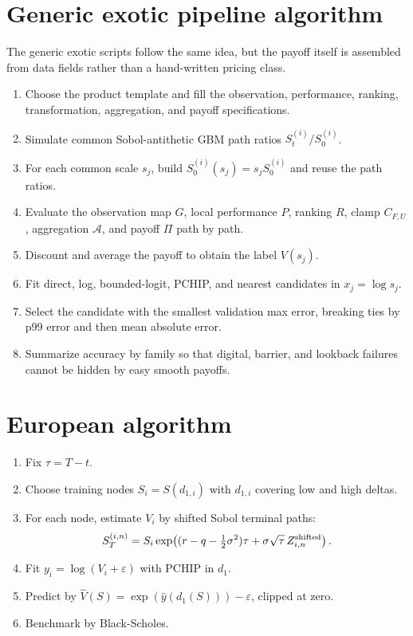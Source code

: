 \documentclass[11pt,oneside]{book}
\theoremstyle{definition}
\begin{document}
\section{Generic exotic pipeline algorithm}
The generic exotic scripts follow the same idea, but the payoff itself is
assembled from data fields rather than a hand-written pricing class.
\begin{enumerate}
  \item Choose the product template and fill the observation, performance,
        ranking, transformation, aggregation, and payoff specifications.
  \item Simulate common Sobol-antithetic GBM path ratios
        \(S_t^{(i)}/S_0^{(i)}\).
  \item For each common scale \(s_j\), build
        \(S_0^{(i)}(s_j)=s_jS_0^{(i)}\) and reuse the path ratios.
  \item Evaluate the observation map \(G\), local performance \(P\), ranking
        \(R\), clamp \(C_{F,U}\), aggregation \(\mathcal A\), and payoff
        \(\Pi\) path by path.
  \item Discount and average the payoff to obtain the label \(V(s_j)\).
  \item Fit direct, log, bounded-logit, PCHIP, and nearest candidates in
        \(x_j=\log s_j\).
  \item Select the candidate with the smallest validation max error, breaking
        ties by p99 error and then mean absolute error.
  \item Summarize accuracy by family so that digital, barrier, and lookback
        failures cannot be hidden by easy smooth payoffs.
\end{enumerate}

\section{European algorithm}
\begin{enumerate}
  \item Fix \(\tau=T-t\).
  \item Choose training nodes \(S_i=S(d_{1,i})\) with \(d_{1,i}\) covering low and high deltas.
  \item For each node, estimate \(V_i\) by shifted Sobol terminal paths:
  \[
    S_T^{(i,n)}
    =
    S_i\exp\!\left((r-q-\tfrac12\sigma^2)\tau+\sigma\sqrt\tau\,Z_{i,n}^{\rm shifted}\right).
  \]
  \item Fit \(y_i=\log(V_i+\varepsilon)\) with PCHIP in \(d_1\).
  \item Predict by \(\widehat V(S)=\exp(\widehat y(d_1(S)))-\varepsilon\), clipped at zero.
  \item Benchmark by Black-Scholes.
\end{enumerate}
\end{document}

